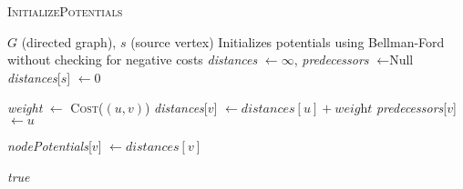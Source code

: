 \documentclass{article}
\begin{document}
\begin{algorithm}[H]
\caption{\textcolor{keywordcolor}{\textsc{InitializePotentials}}}
\begin{algorithmic}[1]
\State {} $G$ (directed graph), $s$ (source vertex)
\State {} Initializes potentials using Bellman-Ford without checking for negative costs
\State \textit{distances} $\gets \infty$, \textit{predecessors} $\gets \text{Null}$
\State \textit{distances}[$s$] $\gets 0$

            \State \textit{weight} $\gets$ \textcolor{identifiercolor}{\textsc{Cost}}($(u, v)$)
                \State \textit{distances}[$v$] $\gets \textit{distances}[u] + \textit{weight}$
                \State \textit{predecessors}[$v$] $\gets u$
            \EndIf
        \EndIf
    \EndFor
\EndFor

    \State \textit{nodePotentials}[$v$] $\gets \textit{distances}[v]$
\EndFor

\State \Return \textit{true}
\end{algorithmic}
\end{algorithm}
\end{document}
